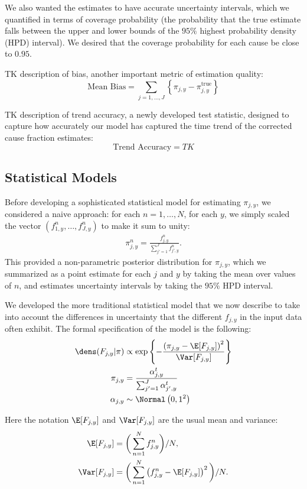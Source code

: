   We also wanted the estimates to have accurate uncertainty intervals,
  which we quantified in terms of coverage probability (the
  probability that the true estimate falls between the upper and lower
  bounds of the $95\%$ highest probability density (HPD) interval).  We desired that the
  coverage probability for each cause be close to $0.95$.

  TK description of bias, another important metric of estimation quality:
  \[
  \text{Mean Bias} = \sum_{j=1,\ldots, J} \left\{ \pi_{j,y} - \pi^{\text{true}}_{j,y} \right\}
  \]

  TK description of trend accuracy, a newly developed test statistic,
  designed to capture how accurately our model has captured the time
  trend of the corrected cause fraction estimates:
  \[
  \text{Trend Accuracy} = TK
  \]

  \subsection*{Statistical Models}
  Before developing a sophisticated statistical model for estimating
  $\pi_{j,y}$, we considered a naive approach: for each
  $n=1,\ldots,N$, for each $y$, we simply scaled the vector
  $(f_{1,y}^n, \ldots, f_{J,y}^n)$ to make it sum to unity:
  \begin{align*}
    \pi_{j,y}^n = \frac{f_{j,y}^n}{\sum_{j'=1}^J f_{j',y}^n}.
  \end{align*}
  This provided a non-parametric posterior distribution for
  $\pi_{j,y}$, which we summarized as a point estimate for each $j$
  and $y$ by taking the mean over values of $n$, and estimates
  uncertainty intervals by taking the $95\%$ HPD interval.

  We developed the more traditional statistical model that we now
  describe to take into account the differences in uncertainty that
  the different $f_{j,y}$ in the input data often exhibit.  The formal
  specification of the model is the following:
  \begin{align*}
    \dens(F_{j,y} | \pi) &\propto \exp\left\{-\frac{\left(\pi_{j,y}-\E[F_{j,y}]\right)^2}{\Var[F_{j,y}]} \right\}\\
    \pi_{j,y} &= \frac{\alpha_{j,y}^t}{\sum_{j'=1}^J \alpha_{j',y}^t}\\
    \alpha_{j,y} &\sim \Normal\left(0, 1^2\right)
  \end{align*}

  Here the notation $\E[F_{j,y}]$ and $\Var[F_{j,y}]$ are the usual mean and variance:
  \begin{align*}
    \E[F_{j,y}] &= \bigg(\sum_{n=1}^N f_{j,y}^n\bigg) / N,\\
    \Var[F_{j,y}] &= \bigg(\sum_{n=1}^N \left(f_{j,y}^n - \E[F_{j,y}]\right)^2\bigg) / N.\\
  \end{align*}

